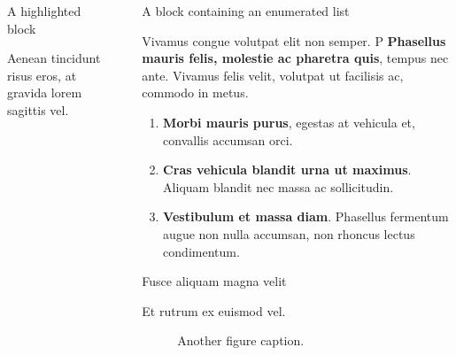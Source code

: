 \documentclass[final]{beamer}
\newlength{\sepwidth}
\newlength{\colwidth}
\newcommand{\separatorcolumn}{\begin{column}{\sepwidth}\end{column}}
\begin{document}
\begin{frame}[t]
\begin{columns}[t]
\begin{column}{\colwidth}
\begin{alertblock}{A highlighted block}
\begin{itemize}
    \end{itemize}

    Aenean tincidunt risus eros, at gravida lorem sagittis vel.

  \end{alertblock}

\end{column}

\separatorcolumn

\begin{column}{\colwidth}

  \begin{block}{A block containing an enumerated list}

    Vivamus congue volutpat elit non semper. P \textbf{Phasellus mauris felis, molestie
    ac pharetra quis}, tempus nec ante. Vivamus felis velit, volutpat ut facilisis ac,
    commodo in metus.

    \begin{enumerate}
      \item \textbf{Morbi mauris purus}, egestas at vehicula et, convallis
        accumsan orci.
      \item \textbf{Cras vehicula blandit urna ut maximus}. Aliquam blandit nec
        massa ac sollicitudin.
      \item \textbf{Vestibulum et massa diam}. Phasellus fermentum augue non
        nulla accumsan, non rhoncus lectus condimentum.
    \end{enumerate}

  \end{block}

  \begin{block}{Fusce aliquam magna velit}

    Et rutrum ex euismod vel.

    \begin{figure}
      \centering
      \caption{Another figure caption.}
    \end{figure}

  \end{block}


\end{column}
\end{columns}
\end{frame}
\end{document}
